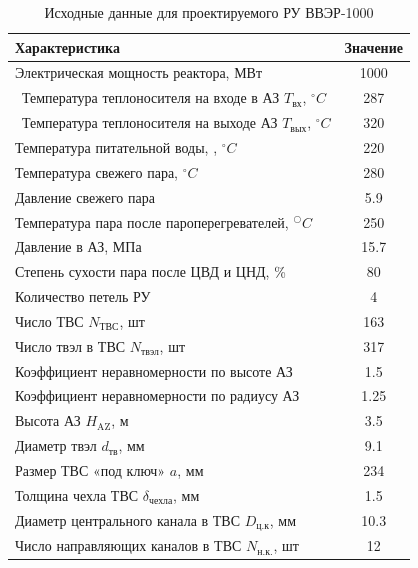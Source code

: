 \begin{table}[H]
	\caption{Исходные данные для проектируемого РУ ВВЭР-1000}
	\begin{center}
        \begin{tabular}{|l|c|}
        \toprule
         Характеристика & Значение \\ 
         \midrule
         \hline
         Электрическая мощность реактора, МВт & 1000 \\
         \hline\ 
         Температура теплоносителя на входе в АЗ $T_{\text{вх}}$, $^\circ C$  & 287 \\ 
         \hline\
         Температура теплоносителя на выходе АЗ $T_{\text{вых}}$, $^\circ C$ & 320 \\ 
         \hline
         Температура питательной воды, , $^\circ C$ & 220 \\ 
         \hline
         Температура свежего пара, $^\circ C$  &  280 \\ 
         \hline
         Давление свежего пара & 5.9 \\ 
         \hline
         Температура пара после пароперегревателей, $^○C$ & 250 \\ 
         \hline
         Давление в АЗ, МПа & 15.7 \\ 
         \hline
         Степень сухости пара после ЦВД и ЦНД, \% & 80 \\ 
         \hline
         Количество петель РУ & 4 \\ 
         \hline
         Число ТВС $N_{\text{ТВС}}$, шт  & 163 \\ 
         \hline
         Число твэл в ТВС $N_{\text{твэл}}$, шт & 317 \\ 
         \hline
         Коэффициент неравномерности по высоте АЗ  & 1.5 \\ 
         \hline
         Коэффициент неравномерности по радиусу АЗ & 1.25 \\ 
         \hline
         Высота АЗ $H_{\text{AZ}}$, м & 3.5 \\ 
         \hline
         Диаметр твэл $d_{\text{тв}}$, мм & 9.1 \\ 
         \hline
         Размер ТВС «под ключ» $a$, мм & 234 \\ 
         \hline
         Толщина чехла ТВС $\delta_{\text{чехла}}$, мм & 1.5 \\
         \hline
         Диаметр центрального канала в ТВС $D_{\text{ц.к}}$, мм & 10.3 \\ 
         \hline
         Число направляющих каналов в ТВС $N_{\text{н.к.}}$, шт & 12 \\ 

\end{tabular}
\end{center}
\end{table}
